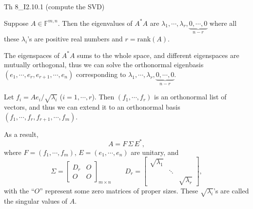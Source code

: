 \documentclass{article}
\begin{document}
\begin{Th}{Th 8\_I2.10.1 (compute the SVD)}
    \begin{compactenum}
        \item Suppose $A\in\mathbb{F}^{m,n}$. Then the eigenvalues of $A^\ast A$ are $\lambda_1,\cdots,\lambda_r,\underbrace{0,\cdots,0}_{n-r}$ where all these $\lambda_i$'s are positive real numbers and $r = \text{rank}(A)$. 
        \item The eigenspaces of $A^\ast A$ sums to the whole space, and different eigenspaces are mutually orthogonal, thus we can solve the orthonormal eigenbasis $(e_1,\cdots,e_r,e_{r+1},\cdots,e_n)$ corresponding to $\lambda_1,\cdots,\lambda_r,\underbrace{0,\cdots,0}_{n-r}$.
        \item Let $f_i = Ae_i/\sqrt{\lambda_i}$ ($i=1,\cdots,r$). Then $(f_1,\cdots,f_r)$ is an orthonormal list of vectors, and thus we can extend it to an orthonormal basis $(f_1, \cdots, f_r, f_{r+1}, \cdots, f_m)$.
        \item As a result,
        $$ A = F\,\Sigma\, E^\ast, $$
        where $F = (f_1,\cdots,f_m)$, $E = (e_1,\cdots, e_n)$ are unitary, and
        $$ \Sigma = \begin{bmatrix}
            D_r & O \\
            O & O
        \end{bmatrix}_{m\times n}\qquad D_r = \begin{bmatrix}
            \sqrt{\lambda_1} & & \\
            & \ddots & \\
            & & \sqrt{\lambda_r}
        \end{bmatrix}, $$
        with the ``$O$'' represent some zero matrices of proper sizes. \textcolor{Df}{These $\sqrt{\lambda_i}$'s are called the singular values of $A$.}
    \end{compactenum}
\end{Th}
\end{document}
